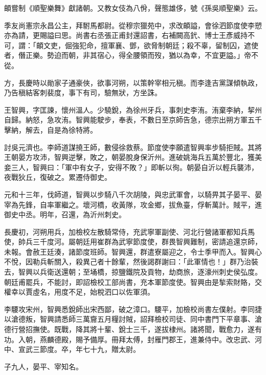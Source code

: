 \begin{pinyinscope}
 頔嘗制《順聖樂舞》獻諸朝。又教女伎為八佾，聲態雄侈，號《孫吳順聖樂》云。



 季友尚憲宗永昌公主，拜駙馬都尉。從穆宗獵苑中，求改頔謚，會徐泗節度使李愬亦為請，更賜謚曰思。尚書右丞張正甫封還詔書，右補闕高釴、博士王彥威持不可，謂：「頔文吏，倔強犯命，擅軍襄、鄧，欲脅制朝廷；殺不辜，留制囚，遮使者，僭正樂。勢迫而朝，非其宿心，得全腰領而歿，猶以為幸，不宜更謚。」帝不從。



 方，長慶時以勛家子通豪俠，欲事河朔，以策幹宰相元稹。而李逢吉黨謀傾執政，乃告稹結客刺裴度，事下有司，驗無狀，方坐誅。



 王智興，字匡諫，懷州溫人。少驍銳，為徐州牙兵，事刺史李洧。洧棄李納，挈州自歸。納怒，急攻洧。智興能駛步，奉表，不數日至京師告急，德宗出朔方軍五千擊納，解去，自是為徐特將。



 討吳元濟也。李師道謀撓王師，數侵徐救蔡。節度使李願遣智興率步騎拒賊。其將王朝晏方攻沛，智興逆擊，敗之，朝晏脫身保沂州。進破姚海兵五萬於豐北，獲美妾三人，智興曰：「軍中有女子，安得不敗？」即斬以徇。朝晏自沂以輕兵襲沛，夜戰狄丘，復破之。累遷侍御史。



 元和十三年，伐師道，智興以步騎八千次胡陵，與忠武軍會，以騎畀其子晏平、晏宰為先鋒，自率軍繼之。壞河橋，收黃隊，攻金鄉，拔魚臺，俘斬萬計。賊平，進御史中丞。明年，召還，為沂州刺史。



 長慶初，河朔用兵，加檢校左散騎常侍，充武寧軍副使、河北行營諸軍都知兵馬使，帥兵三千度河。屬朝廷用崔群為武寧節度使，群畏智興難制，密請追還京師，未報。會赦王廷湊，諸節度班師。智興還，群遣寮屬迎之，令士季甲而入。智興心不悅，因勒兵斬關入，殺異己者十餘輩，然後謁群謝曰：「此軍情也！」群乃治裝去，智興以兵衛送還朝；至埇橋，掠鹽鐵院及貢物，劫商旅，逐濠州刺史侯弘度。朝廷甫罷兵，不能討，即詔檢校工部尚書，充本軍節度使。智興由是揫索財賂，交權幸以賈虛名，用度不足，始稅泗口以佐軍須。



 李騕攻宋州，智興悉銳師出宋西鄙，破之漳口。騕平，加檢校尚書左僕射。李同捷以滄德叛，智興請悉師三萬齎五月糧討賊，詔拜檢校司徒、同中書門下平章事、滄德行營招撫使。既戰，降其將十輩、銳士三千，遂拔棣州。諸將聞，戰愈力，遂有功。入朝，燕麟德殿，賜予備厚。冊拜太傅，封雁門郡王，進兼侍中。改忠武、河中、宣武三節度。卒，年七十九，贈太尉。



 子九人，晏平、宰知名。




\end{pinyinscope}
